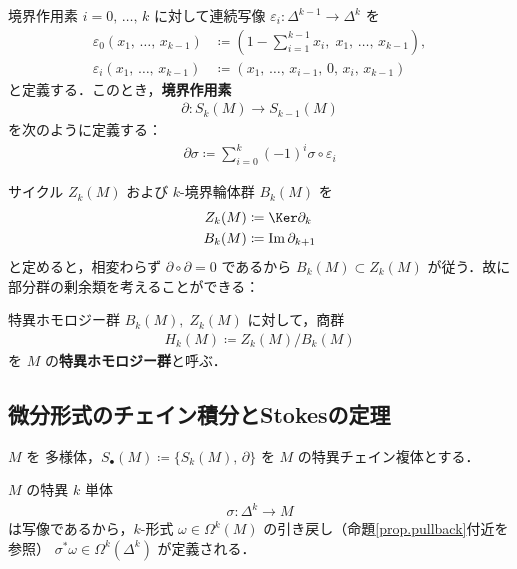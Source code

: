 \documentclass[geometry_main]{subfiles}
\begin{document}
\begin{mydef}[label=def.partial]{境界作用素} 
	$i = 0,\, \dots ,\, k$ に対して連続写像 $\varepsilon_i \colon \varDelta^{k-1} \to \varDelta^k $ を
	\begin{align} 
		\varepsilon_0(x_1,\, \dots ,\, x_{k-1}) &\coloneqq \left(1 - \sum_{i=1}^{k-1} x_i,\; x_1,\, \dots ,\, x_{k-1}\right), \\
		\varepsilon_i(x_1,\, \dots ,\, x_{k-1}) &\coloneqq (x_1,\, \dots ,\, x_{i-1},\, 0 ,\, x_i,\, x_{k-1})
	\end{align}
	と定義する．このとき，\textbf{境界作用素}
	\begin{align} 
		\partial \colon S_k(M) \to S_{k-1}(M)
	\end{align}
	を次のように定義する：
	\begin{align} 
		\partial \sigma \coloneqq \sum_{i=0}^k (-1)^i \sigma \circ \varepsilon_i
	\end{align}
\end{mydef}

サイクル $Z_k(M)$ および $k$-境界輪体群 $B_k(M)$ を
\begin{align} 
	Z_k (M) &\coloneqq \Ker \partial_k \\
	B_k(M) & \coloneqq \Im \partial_{k+1}
\end{align}
と定めると，相変わらず $\partial \circ \partial =0$ であるから $B_{k} (M) \subset Z_k(M)$ が従う．故に部分群の剰余類を考えることができる：
\begin{mydef}[label=sg_HomologyGroup]{特異ホモロジー群}
	$B_{k} (M),\; Z_k(M)$ に対して，商群
	\begin{align} 
		H_k(M) \coloneqq Z_k(M) / B_k(M)
	\end{align}
	を $M$ の\textbf{特異ホモロジー群}と呼ぶ．
\end{mydef}

\subsection{微分形式のチェイン積分とStokesの定理}

$M$ を \cinfty 多様体，$S_\bullet(M) \coloneqq \{ S_k(M),\, \partial \}$ を $M$ の\cinfty 特異チェイン複体とする．

$M$ の特異 $k$ 単体
\begin{align} 
	\sigma \colon \varDelta^k \to M
\end{align}
は\cinfty 写像であるから，$k$-形式 $\omega \in \Omega^k(M)$ の引き戻し（命題\ref{prop.pullback}付近を参照） $\sigma^* \omega \in \Omega^k(\varDelta^k)$ が定義される．
\end{document}
